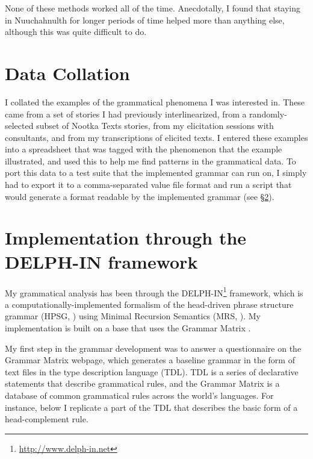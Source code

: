 
None of these methods worked all of the time. Anecdotally, I found that staying in Nuuchahnulth for longer periods of time helped more than anything else, although this was quite difficult to do.

\section{Data Collation} \label{sec:method:collation}

I collated the examples of the grammatical phenomena I was interested in. These came from a set of stories I had previously interlinearized, from a randomly-selected subset of Nootka Texts stories, from my elicitation sessions with consultants, and from my transcriptions of elicited texts. I entered these examples into a spreadsheet that was tagged with the phenomenon that the example illustrated, and used this to help me find patterns in the grammatical data. To port this data to a test suite that the implemented grammar can run on, I simply had to export it to a comma-separated value file format and run a script that would generate a format readable by the implemented grammar (see \S\ref{sec:method:delphin}).

\section{Implementation through the DELPH-IN framework} \label{sec:method:delphin}

My grammatical analysis has been through the DELPH-IN\footnote{\url{http://www.delph-in.net}} framework, which is a computationally-implemented formalism of the head-driven phrase structure grammar (HPSG, \citealt{pollardsag1994}) using Minimal Recursion Semantics (MRS, \citealt{copestake2005}). My implementation is built on a base that uses the Grammar Matrix \citep{bender2002, benderetal2010}.

My first step in the grammar development was to answer a questionnaire on the Grammar Matrix webpage, which generates a baseline grammar in the form of text files in the type description language (TDL). TDL is a series of declarative statements that describe grammatical rules, and the Grammar Matrix is a database of common grammatical rules across the world's languages. For instance, below I replicate a part of the TDL that describes the basic form of a head-complement rule.

